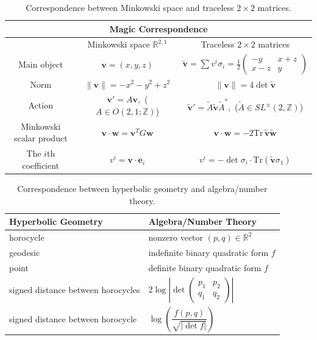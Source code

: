 \documentclass[12pt,a4paper]{amsart}
\begin{document}
\begin{table}[h]
\renewcommand{\arraystretch}{2}
\begin{tabular}{|c|c|c|}
\hline
\multicolumn{3}{|c|}{\textbf{Magic Correspondence}} \\
\hline
 & Minkowski space $\mathbb{R}^{2,1}$ & Traceless $2 \times 2$ matrices \\
\hline
Main object & 
$\mathbf{v} = (x, y, z)$ & 
$\tilde{\mathbf{v}} = \sum v^i \sigma_i = \frac{1}{2}
\begin{pmatrix} -y & x+z \\ x-z & y \end{pmatrix}$ \\
\hline
Norm & 
$\|\mathbf{v}\| = -x^2 - y^2 + z^2$ & 
$\|\mathbf{v}\| = 4 \det \tilde{\mathbf{v}}$ \\
\hline
Action & 
$\mathbf{v}' = A\mathbf{v}$,\, \newline ($A \in O(2,1;\mathbb{Z})$) & 
$\tilde{\mathbf{v}}' = \tilde{A} \tilde{\mathbf{v}} \tilde{A}^*$,\, \newline ($\tilde{A} \in SL^{\pm}(2,\mathbb{Z})$) \\
\hline
Minkowski scalar product & 
$\mathbf{v} \cdot \mathbf{w} = \mathbf{v}^T G \mathbf{w}$ & 
$\mathbf{v} \cdot \mathbf{w} = -2 \mathrm{Tr}\,\tilde{\mathbf{v}} \tilde{\mathbf{w}}$ \\
\hline
The $i$th coefficient & 
$v^i = \mathbf{v} \cdot \mathbf{e}_i$ & 
$v^i = -\det \sigma_i \cdot \mathrm{Tr}(\tilde{\mathbf{v}} \sigma_1)$ \\
\hline
\end{tabular}
\caption{Correspondence between Minkowski space and traceless $2 \times 2$ matrices.}
\end{table}


\begin{table}[h]
\renewcommand{\arraystretch}{2}
\begin{tabular}{|l|l|}
\textbf{Hyperbolic Geometry} & \textbf{Algebra/Number Theory} \\
\hline
horocycle & nonzero vector $(p,q) \in \mathbb{R}^2$ \\
\hline
geodesic & indefinite binary quadratic form $f$ \\
point & definite binary quadratic form $f$ \\
signed distance between horocycles & $2 \log \left| \det \begin{pmatrix} p_1 & p_2 \\ q_1 & q_2 \end{pmatrix} \right|$ \\
signed distance between horocycle & $\log \left( \dfrac{f(p,q)}{\sqrt{|\det f|}} \right)$ \\
\end{tabular}
\caption{Correspondence between hyperbolic geometry and algebra/number theory.}
\end{table}
\end{document}
